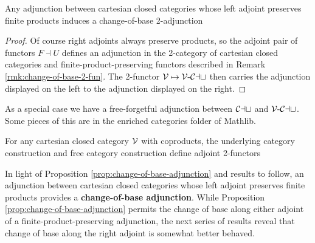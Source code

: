 \begin{proposition}\label{prop:change-of-base-adjunction}
  Any adjunction between cartesian closed categories whose left adjoint preserves finite products induces a change-of-base 2-adjunction
\begin{center}
\end{center}
\end{proposition}
\begin{proof}
Of course right adjoints always preserve products, so the adjoint pair of functors $F \dashv U$ defines an adjunction in the 2-category of cartesian closed categories and finite-product-preserving functors described in Remark \ref{rmk:change-of-base-2-fun}. The 2-functor ${\mathord{\mathcal{V}}} \mapsto {{\mathord{\mathcal{V}}}}\text{-}{\mathord{\mathcal{Cat}}}$ then carries the adjunction displayed on the left to the adjunction displayed on the right.
\end{proof}

As a special case we have a free-forgetful adjunction between ${\mathord{\mathcal{Cat}}}$ and ${{\mathord{\mathcal{V}}}}\text{-}{\mathord{\mathcal{Cat}}}$. Some pieces of this are in the enriched categories folder of Mathlib.

\begin{corollary}\label{cor:free-underlying-2-adj}
 For any cartesian closed category ${\mathord{\mathcal{V}}}$ with coproducts, the underlying category construction and free category construction define  adjoint 2-functors
\begin{center}
\end{center}
\end{corollary}


In light of Proposition \ref{prop:change-of-base-adjunction} and results to follow, an adjunction between cartesian closed categories whose left adjoint preserves finite products provides a \textbf{change-of-base adjunction}. While Proposition \ref{prop:change-of-base-adjunction} permits the change of base along either adjoint of a finite-product-preserving adjunction, the next series of results reveal that change of base along the right adjoint is somewhat better behaved.


